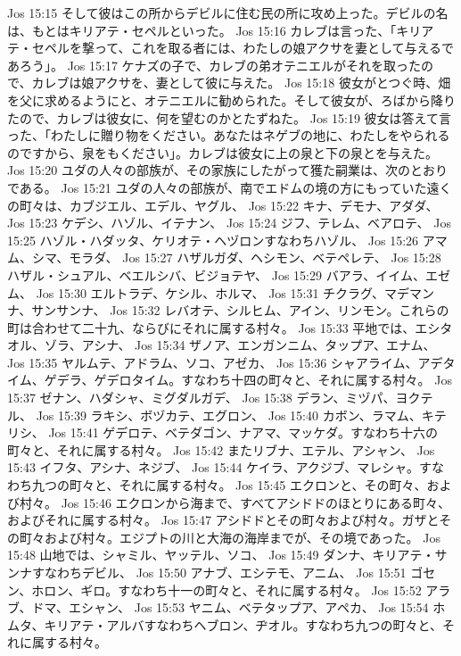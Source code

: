 Jos 15:15  そして彼はこの所からデビルに住む民の所に攻め上った。デビルの名は、もとはキリアテ・セペルといった。
Jos 15:16  カレブは言った、「キリアテ・セペルを撃って、これを取る者には、わたしの娘アクサを妻として与えるであろう」。
Jos 15:17  ケナズの子で、カレブの弟オテニエルがそれを取ったので、カレブは娘アクサを、妻として彼に与えた。
Jos 15:18  彼女がとつぐ時、畑を父に求めるようにと、オテニエルに勧められた。そして彼女が、ろばから降りたので、カレブは彼女に、何を望むのかとたずねた。
Jos 15:19  彼女は答えて言った、「わたしに贈り物をください。あなたはネゲブの地に、わたしをやられるのですから、泉をもください」。カレブは彼女に上の泉と下の泉とを与えた。
Jos 15:20  ユダの人々の部族が、その家族にしたがって獲た嗣業は、次のとおりである。
Jos 15:21  ユダの人々の部族が、南でエドムの境の方にもっていた遠くの町々は、カブジエル、エデル、ヤグル、
Jos 15:22  キナ、デモナ、アダダ、
Jos 15:23  ケデシ、ハゾル、イテナン、
Jos 15:24  ジフ、テレム、ベアロテ、
Jos 15:25  ハゾル・ハダッタ、ケリオテ・ヘヅロンすなわちハゾル、
Jos 15:26  アマム、シマ、モラダ、
Jos 15:27  ハザルガダ、ヘシモン、ベテペレテ、
Jos 15:28  ハザル・シュアル、ベエルシバ、ビジョテヤ、
Jos 15:29  バアラ、イイム、エゼム、
Jos 15:30  エルトラデ、ケシル、ホルマ、
Jos 15:31  チクラグ、マデマンナ、サンサンナ、
Jos 15:32  レバオテ、シルヒム、アイン、リンモン。これらの町は合わせて二十九、ならびにそれに属する村々。
Jos 15:33  平地では、エシタオル、ゾラ、アシナ、
Jos 15:34  ザノア、エンガンニム、タップア、エナム、
Jos 15:35  ヤルムテ、アドラム、ソコ、アゼカ、
Jos 15:36  シャアライム、アデタイム、ゲデラ、ゲデロタイム。すなわち十四の町々と、それに属する村々。
Jos 15:37  ゼナン、ハダシャ、ミグダルガデ、
Jos 15:38  デラン、ミヅパ、ヨクテル、
Jos 15:39  ラキシ、ボヅカテ、エグロン、
Jos 15:40  カボン、ラマム、キテリシ、
Jos 15:41  ゲデロテ、ベテダゴン、ナアマ、マッケダ。すなわち十六の町々と、それに属する村々。
Jos 15:42  またリブナ、エテル、アシャン、
Jos 15:43  イフタ、アシナ、ネジブ、
Jos 15:44  ケイラ、アクジブ、マレシャ。すなわち九つの町々と、それに属する村々。
Jos 15:45  エクロンと、その町々、および村々。
Jos 15:46  エクロンから海まで、すべてアシドドのほとりにある町々、およびそれに属する村々。
Jos 15:47  アシドドとその町々および村々。ガザとその町々および村々。エジプトの川と大海の海岸までが、その境であった。
Jos 15:48  山地では、シャミル、ヤッテル、ソコ、
Jos 15:49  ダンナ、キリアテ・サンナすなわちデビル、
Jos 15:50  アナブ、エシテモ、アニム、
Jos 15:51  ゴセン、ホロン、ギロ。すなわち十一の町々と、それに属する村々。
Jos 15:52  アラブ、ドマ、エシャン、
Jos 15:53  ヤニム、ベテタップア、アペカ、
Jos 15:54  ホムタ、キリアテ・アルバすなわちヘブロン、ヂオル。すなわち九つの町々と、それに属する村々。
